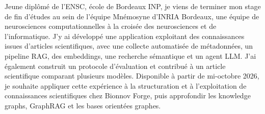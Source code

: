 
\begin{cvparagraph}
Jeune diplômé de l’ENSC, école de Bordeaux INP, je viens de terminer mon stage de fin d’études au sein de l’équipe Mnémosyne d’INRIA Bordeaux, une équipe de neurosciences computationnelles à la croisée des neurosciences et de l’informatique. J’y ai développé une application exploitant des connaissances issues d’articles scientifiques, avec une collecte automatisée de métadonnées, un pipeline RAG, des embeddings, une recherche sémantique et un agent LLM. J’ai également construit un protocole d’évaluation et contribué à un article scientifique comparant plusieurs modèles. Disponible à partir de mi-octobre 2026, je souhaite appliquer cette expérience à la structuration et à l’exploitation de connaissances scientifiques chez Bionnov Forge, puis approfondir les knowledge graphs, GraphRAG et les bases orientées graphes.
\end{cvparagraph}
